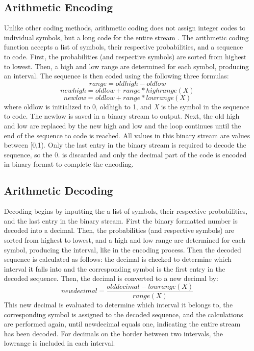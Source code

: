 \documentclass[11pt,a4paper,table]{article}
\begin{document}
\subsection{Arithmetic Encoding}
Unlike other coding methods, arithmetic coding does not assign integer codes to individual symbols, but a long code for the entire stream \cite{Salomon2007}. The arithmetic coding function accepts a list of symbols, their respective probabilities, and a sequence to code. First, the probabilities (and respective symbols) are sorted from highest to lowest. Then, a high and low range are determined for each symbol, producing an interval. The sequence is then coded using the following three formulas:
\begin{equation}
range = oldhigh - oldlow
\end{equation}
\begin{equation}
newhigh = oldlow + range*highrange(X)
\end{equation}
\begin{equation}
newlow = old low + range*lowrange(X)
\end{equation}
where oldlow is initialized to 0, oldhigh to 1, and \textit{X} is the symbol in the sequence to code. The newlow is saved in a binary stream to output. Next, the old high and low are replaced by the new high and low and the loop continues until the end of the sequence to code is reached. All values in this binary stream are values between [0,1). Only the last entry in the binary stream is required to decode the sequence, so the 0. is discarded and only the decimal part of the code is encoded in binary format to complete the encoding.

\subsection{Arithmetic Decoding}
Decoding begins by inputting the a list of symbols, their respective probabilities, and the last entry in the binary stream. First the binary formatted number is decoded into a decimal. Then, the probabilities (and respective symbols) are sorted from highest to lowest, and a high and low range are determined for each symbol, producing the interval, like in the encoding process. Then the decoded sequence is calculated as follows: the decimal is checked to determine which interval it falls into and the corresponding symbol is the first entry in the decoded sequence. Then, the decimal is converted to a new decimal by:
 \begin{equation}
newdecimal = \frac{olddecimal - lowrange(X)}{range(X)}
\end{equation}
This new decimal is evaluated to determine which interval it belongs to, the corresponding symbol is assigned to the decoded sequence, and the calculations are performed again, until newdecimal equals one, indicating the entire stream has been decoded. For decimals on the border between two intervals, the lowrange is included in each interval.
\end{document}
